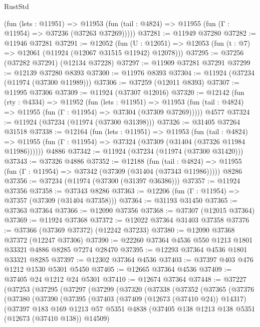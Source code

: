\begin{lexlean}{RustStd}
\begin{coremodule}
{\begin{coremodule}
{{{{{{{{{{{{{{{{{{{{{{{{{{{{{{{{{{{{{{{{{{{{{{{{{{{{{{{{{{{{{{{{{{{{{{{{{{{{{{{{      (fun (lets : @11951) =>
      @11953 (fun (tail : @4824) => @11955 (fun (Γ : @11954) => @37236 (@37263 @37269)))))
@37281 := @11949 @37280
@37282 := @11946 @37281
@37291 := @12052
    (fun (U : @12051) => @12053 (fun (t : @7) => @12061 (@11924 (@12067 @31515 @11942) @12078)))
@37295 := @37256 (@37282 @37291) (@12134 @37228)
@37297 := @11909 @37281 @37291
@37299 := @12139 @37280 @8393
@37300 := @11976 @8393
@37304 := @11924 (@37234 (@11974 (@37300 @11989)))
@37306 := @37259 (@12011 @8393)
@37307 := @11995 @37306
@37309 := @11924 (@37307 @12016)
@37320 := @12142
    (fun (rty : @4334) =>
    @11952
      (fun (lets : @11951) =>
      @11953 (fun (tail : @4824) => @11955 (fun (Γ : @11954) => @37304 (@37309 @37269)))))
    @4577
@37324 := @11924 (@37234 (@11974 (@37300 @31398)))
@37326 := @31405 @37264 @31518
@37338 := @12164
    (fun (lets : @11951) =>
    @11953
      (fun (tail : @4824) =>
      @11955 (fun (Γ : @11954) => @37324 (@37309 (@31404 (@37326 @11984 @11986))))))
    @4886
@37342 := @11924 (@37234 (@11974 (@37300 @31420)))
@37343 := @37326 @4886
@37352 := @12188
    (fun (tail : @4824) => @11955 (fun (Γ : @11954) => @37342 (@37309 (@31404 (@37343 @11986)))))
    @8286
@37356 := @37234 (@11974 (@37300 (@31397 @36386)))
@37357 := @11924 @37356
@37358 := @37343 @8286
@37363 := @12206 (fun (Γ : @11954) => @37357 (@37309 (@31404 @37358)))
@37364 := @31193 @31450
@37365 := @37363 @37364
@37366 := @12090 @37356
@37368 := @37307 (@12015 @37364)
@37369 := @11924 @37368
@37372 := @12022 @37364 @31403 @37358
@37376 := @37366 (@37369 @37372) (@12242 @37233)
@37380 := @12090 @37368 @37372 (@12247 @37306)
@37390 := @22260 @37364 @4536 @550 @1213 @1801 @33321 @4886 @8285 @7274 @28470
@37395 := @12293 @37364 @4536 @1801 @33321 @8285
@37397 := @12302 @37364 @4536
@37403 := @37397 @403 @476 @1212 @1530 @5301 @5450
@37405 := @12665 @37364 @4536
@37409 := @37405 @24 @1212 @24 @5301
@37410 := @12674 @37364
@37448 := @37227
    (@37253
      (@37295
        (@37297
          (@37299
            (@37320
              (@37338
                (@37352
                  (@37365
                    (@37376
                      (@37380
                        (@37390
                          (@37395
                            (@37403
                              (@37409 (@12673 (@37410 @24)) @14317)
                              (@37397
                                @183
                                @169
                                @1213
                                @57
                                @5351
                                @4838
                                (@37405 @138 @1213 @138 @5351 (@12673 (@37410 @138)) @14509)
}}}}}}}}}}}}}}}}}}}}}}}}}}}}}}}}}}}}}}}}}}}}}}}}}}}}}}}}}}}}}}}}}}}}}}}}}}}}}}}}
\end{coremodule}}
\end{coremodule}
\end{lexlean}
